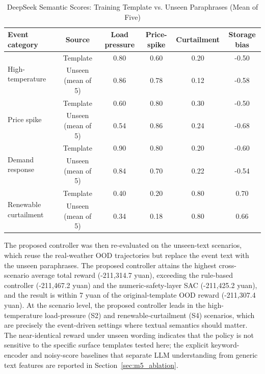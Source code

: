 \documentclass{ieeeaccess}
\begin{document}
\begin{table}[t!]
\caption{DeepSeek Semantic Scores: Training Template vs. Unseen Paraphrases (Mean of Five)}
\label{tab:semantic_scores}
\centering
\begin{tabular}{lccccc}
\toprule
\textbf{Event category} & \textbf{Source} & \textbf{Load pressure} & \textbf{Price-spike} & \textbf{Curtailment} & \textbf{Storage bias} \\
\midrule
\multirow{2}{*}{High-temperature} & Template & 0.80 & 0.60 & 0.20 & -0.50 \\
& Unseen (mean of 5) & 0.86 & 0.78 & 0.12 & -0.58 \\
\multirow{2}{*}{Price spike} & Template & 0.60 & 0.80 & 0.30 & -0.50 \\
& Unseen (mean of 5) & 0.54 & 0.86 & 0.24 & -0.68 \\
\multirow{2}{*}{Demand response} & Template & 0.90 & 0.80 & 0.20 & -0.60 \\
& Unseen (mean of 5) & 0.84 & 0.70 & 0.22 & -0.54 \\
\multirow{2}{*}{Renewable curtailment} & Template & 0.40 & 0.20 & 0.80 & 0.70 \\
& Unseen (mean of 5) & 0.34 & 0.18 & 0.80 & 0.66 \\
\bottomrule
\end{tabular}
\end{table}


The proposed controller was then re-evaluated on the unseen-text scenarios, which reuse the real-weather OOD trajectories but replace the event text with the unseen paraphrases. The proposed controller attains the highest cross-scenario average total reward (-211,314.7 yuan), exceeding the rule-based controller (-211,467.2 yuan) and the numeric-safety-layer SAC (-211,425.2 yuan), and the result is within 7 yuan of the original-template OOD reward (-211,307.4 yuan). At the scenario level, the proposed controller leads in the high-temperature load-pressure (S2) and renewable-curtailment (S4) scenarios, which are precisely the event-driven settings where textual semantics should matter. The near-identical reward under unseen wording indicates that the policy is not sensitive to the specific surface templates tested here; the explicit keyword-encoder and noisy-score baselines that separate LLM understanding from generic text features are reported in Section~\ref{sec:m5_ablation}.
\end{document}
